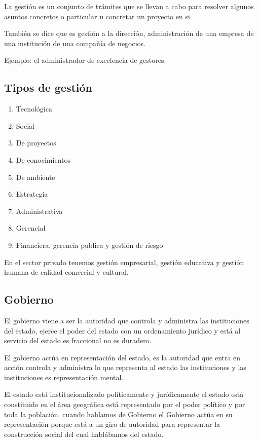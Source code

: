 \documentclass[
  letterpaper,
  DIV=11,
  numbers=noendperiod]{scrartcl}
\providecommand{\tightlist}{%
  \setlength{\itemsep}{0pt}\setlength{\parskip}{0pt}}\usepackage{longtable,booktabs,array}
\begin{document}
La gestión es un conjunto de trámites que se llevan a cabo para resolver
algunos asuntos concretos o particular u concretar un proyecto en si.

También se dice que es gestión a la dirección, administración de una
empresa de una institución de una compañía de negocios.

Ejemplo: el administrador de excelencia de gestores.

\hypertarget{tipos-de-gestiuxf3n}{%
\subsection{Tipos de gestión}\label{tipos-de-gestiuxf3n}}

\begin{enumerate}
\def\labelenumi{\arabic{enumi}.}
\tightlist
\item
  Tecnológica
\item
  Social
\item
  De proyectos
\item
  De conocimientos
\item
  De ambiente
\item
  Estrategia
\item
  Administrativa
\item
  Gerencial
\item
  Financiera, gerencia publica y gestión de riesgo
\end{enumerate}

En el sector privado tenemos gestión empresarial, gestión educativa y
gestión humana de calidad comercial y cultural.

\hypertarget{gobierno}{%
\subsection{Gobierno}\label{gobierno}}

El gobierno viene a ser la autoridad que controla y administra las
instituciones del estado, ejerce el poder del estado con un ordenamiento
jurídico y está al servicio del estado es fraccional no es duradero.

El gobierno actúa en representación del estado, es la autoridad que
entra en acción controla y administra lo que representa al estado las
instituciones y las instituciones es representación mental.

El estado está institucionalizado políticamente y jurídicamente el
estado está constituido en el área geográfica está representado por el
poder político y por toda la población. cuando hablamos de Gobierno el
Gobierno actúa en su representación porque está a un giro de autoridad
para representar la construcción social del cual hablábamos del estado.
\end{document}
